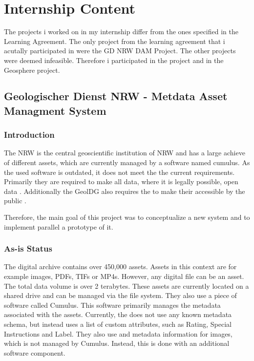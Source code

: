 \documentclass[11pt, titlepage, a4paper]{article}
\begin{document}
\section{Internship Content}
The projects i worked on in my internship differ from the ones specified in the Learning Agreement. The only project from the learning agreement that i acutally participated in were the GD NRW DAM Project. The other projects were deemed infeasible. Therefore i participated in the  project and in the Geosphere project. 

\subsection{Geologischer Dienst NRW - Metdata Asset Managment System}
\subsubsection{Introduction}
The   NRW  is the central geoscientific institution of NRW and has a large achieve of different assets, which are currently managed by a software named cumulus. As the used software is outdated, it does not meet the the current requirements.
Primarily they  are required to make all data, where it is legally possible, open data \cite{GesetzZurForderung2017}.
Additionally the GeolDG also requires the  to make their accessible by the public \cite{GesetzZurStaatlichen2020}.

Therefore, the main goal of this project was to conceptualize a new system and to implement parallel a prototype of it.
\subsubsection{As-is Status}
The  digital archive contains over 450,000 assets. Assets in this context are for example images, PDFs, TIFs or MP4s. However, any digital file can be an asset. The total data volume is over 2 terabytes.
These assets are currently located on a shared drive and can be managed via the file system. They also use a piece of software called Cumulus. This software primarily manages the metadata associated with the assets. Currently, the  does not use any known metadata schema, but instead uses a list of custom attributes, such as Rating, Special Instructions and Label.
They also use  and  metadata information for images, which is not managed by Cumulus. Instead, this is done with an additional software component. %
\end{document}
